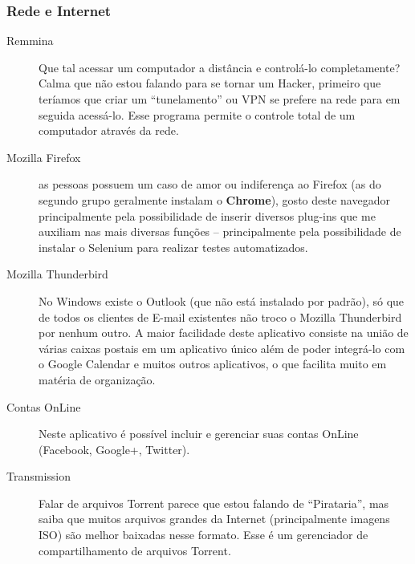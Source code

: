 \subsubsection{Rede e Internet}
\begin{description}
 \item[Remmina] Que tal acessar um computador a distância e controlá-lo completamente? Calma que não estou falando para se tornar um Hacker, primeiro que teríamos que criar um ``tunelamento'' ou VPN se prefere na rede para em seguida acessá-lo. Esse programa permite o controle total de um computador através da rede.
 \item[Mozilla Firefox] as pessoas possuem um caso de amor ou indiferença ao Firefox (as do segundo grupo geralmente instalam o \textbf{Chrome}), gosto deste navegador principalmente pela possibilidade de inserir diversos plug-ins que me auxiliam nas mais diversas funções – principalmente pela possibilidade de instalar o Selenium para realizar testes automatizados.
 \item[Mozilla Thunderbird] No Windows existe o Outlook (que não está instalado por padrão), só que de todos os clientes de E-mail existentes não troco o Mozilla Thunderbird por nenhum outro. A maior facilidade deste aplicativo consiste na união de várias caixas postais em um aplicativo único além de poder integrá-lo com o Google Calendar e muitos outros aplicativos, o que facilita muito em matéria de organização.
 \item[Contas OnLine] Neste aplicativo é possível incluir e gerenciar suas contas OnLine (Facebook, Google+, Twitter).
 \item[Transmission] Falar de arquivos Torrent parece que estou falando de ``Pirataria'', mas saiba que muitos arquivos grandes da Internet (principalmente imagens ISO) são melhor baixadas nesse formato. Esse é um gerenciador de compartilhamento de arquivos Torrent.
\end{description}

